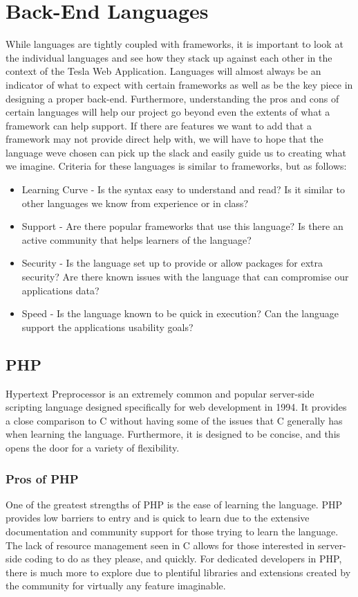 \documentclass[onecolumn, draftclsnofoot,10pt, compsoc]{IEEEtran}
\begin{document}
\section{Back-End Languages}
While languages are tightly coupled with frameworks, it is important to look at the individual languages and see how they stack up against each other in the context of the Tesla Web Application. Languages will almost always be an indicator of what to expect with certain frameworks as well as be the key piece in designing a proper back-end. Furthermore, understanding the pros and cons of certain languages will help our project go beyond even the extents of what a framework can help support. If there are features we want to add that a framework may not provide direct help with, we will have to hope that the language we\textquotesingle ve chosen can pick up the slack and easily guide us to creating what we imagine\cite{long_2016}. Criteria for these languages is similar to frameworks, but as follows: 
\begin{itemize}
    \item Learning Curve - Is the syntax easy to understand and read? Is it similar to other languages we know from experience or in class?
    \item Support - Are there popular frameworks that use this language? Is there an active community that helps learners of the language?
    \item Security - Is the language set up to provide or allow packages for extra security? Are there known issues with the language that can compromise our application\textquotesingle s data?
    \item Speed - Is the language known to be quick in execution? Can the language support the application\textquotesingle s usability goals?
\end{itemize}
\subsection{PHP}
Hypertext Preprocessor is an extremely common and popular server-side scripting language designed specifically for web development in 1994. It provides a close comparison to C without having some of the issues that C generally has when learning the language. Furthermore, it is designed to be concise, and this opens the door for a variety of flexibility. 

\subsubsection{Pros of PHP}
One of the greatest strengths of PHP is the ease of learning the language. PHP provides low barriers to entry and is quick to learn due to the extensive documentation and community support for those trying to learn the language. The lack of resource management seen in C allows for those interested in server-side coding to do as they please, and quickly. For dedicated developers in PHP, there is much more to explore due to plentiful libraries and extensions created by the community for virtually any feature imaginable. 
\end{document}
